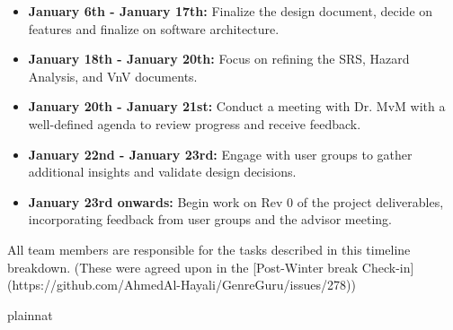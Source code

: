 \documentclass[12pt, titlepage]{article}
\begin{document}
\begin{itemize}
    \item \textbf{January 6th - January 17th:} Finalize the design document, decide on features and finalize on software architecture.
    \item \textbf{January 18th - January 20th:} Focus on refining the SRS, Hazard Analysis, and VnV documents.
    \item \textbf{January 20th - January 21st:} Conduct a meeting with Dr. MvM with a well-defined agenda to review progress and receive feedback.
    \item \textbf{January 22nd - January 23rd:} Engage with user groups to gather additional insights and validate design decisions.
    \item \textbf{January 23rd onwards:} Begin work on Rev 0 of the project deliverables, incorporating feedback from user groups and the advisor meeting.
\end{itemize}

All team members are responsible for the tasks described in this timeline breakdown. (These were agreed upon in the [Post-Winter break Check-in](https://github.com/AhmedAl-Hayali/GenreGuru/issues/278))


 {plainnat}


\newpage{}
\end{document}
